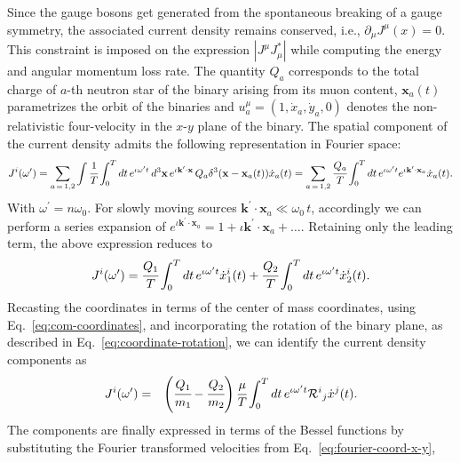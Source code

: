 \documentclass[aps,prd]{revtex4-2}
\begin{document}
Since the gauge bosons get generated from the spontaneous breaking of a gauge symmetry, the associated current density remains conserved, i.e., $\partial_\mu J^{\mu}(x)=0$. This constraint is imposed on the expression $|J^\mu J_\mu^*|$ while computing the energy and angular momentum loss rate. The quantity $Q_a$ corresponds to the total charge of $a$-th neutron star of the binary arising from its muon content, $\mathbf{x}_a(t)$ parametrizes the orbit of the binaries and $u^{\mu}_a = (1, \dot{x}_a, \dot{y}_a, 0)$ denotes the non-relativistic four-velocity in the $x$-$y$ plane of the binary. The spatial component of the current density admits the following representation in Fourier space:
\begin{eqnarray}\label{eq:current-density-fourier-full}
    J^i(\omega^\prime) = \sum\limits_{a\, =\, 1,2} \int \cfrac{1}{T} \int^T_0 dt\, e^{\iota\omega^{\prime} t}\,d^3\mathbf{x}\, e^{\iota \mathbf{k}^\prime \cdot \mathbf{x}}\, Q_{a} \delta^3 (\mathbf{x}-\mathbf{x}_a(t))\dot{x}_{a}(t)
    = \sum\limits_{a\, =\, 1,2} \cfrac{Q_{a}}{T} \int^T_0 dt \, e^{\iota\omega^{\prime} t} e^{\iota \mathbf{k}^\prime \cdot \mathbf{x}_{a}} \dot{x}_{a}(t).
\end{eqnarray}
With $\omega^\prime = n\omega_0$. For slowly moving sources $\mathbf{k}^{\prime}\cdot\mathbf{x}_{a} \ll \omega_0\, t$, accordingly we can perform a series expansion of $e^{\iota \mathbf{k}^{\prime} \cdot\mathbf{x}_{a}} = 1 + \iota \mathbf{k}^{\prime} \cdot\mathbf{x}_{a} + \dots$. Retaining only the leading term, the above expression reduces to
\begin{eqnarray}\label{eq:current-density-fourier-lo}
J^i(\omega^\prime) = \cfrac{Q_{1}}{T} \int^{T}_{0} dt \, e^{\iota \omega^{\prime} t} \dot{x}^{i}_{1} (t) + \cfrac{Q_{2}}{T} \int^{T}_{0} dt \, e^{\iota \omega^{\prime} t} \dot{x}^{i}_{2}(t). 
\end{eqnarray}
Recasting the coordinates in terms of the center of mass coordinates, using Eq.~\eqref{eq:com-coordinates}, and incorporating the rotation of the binary plane, as described in Eq.~\eqref{eq:coordinate-rotation}, we can identify the current density components as
\begin{eqnarray}\label{eq:current-density-com-rotated}
    J^{i}(\omega^\prime) &=& \left(\cfrac{Q_{1}}{m_{1}} - \cfrac{Q_{2}}{m_{2}}\right) \cfrac{\mu}{T} \int^{T}_{0} dt \, e^{\iota  \omega^{\prime} t} \mathcal{R}^{i}{}_{j}\dot{x}^{j}(t). 
\end{eqnarray}
The components are finally expressed in terms of the Bessel functions by substituting the Fourier transformed velocities from Eq.~\eqref{eq:fourier-coord-x-y},
\end{document}
